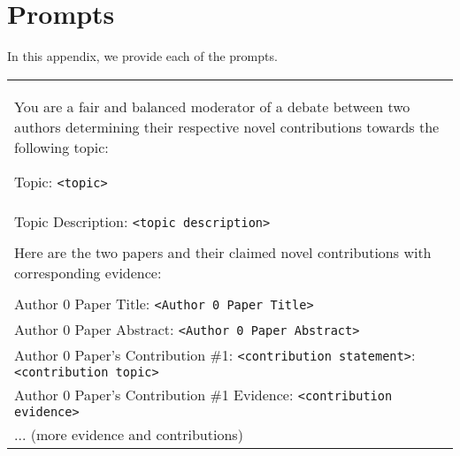 \section{Prompts}
\label{appendix: prompts}
In this appendix, we provide each of the prompts.

\begin{table*}[h]
\centering
\begin{tabularx}{\textwidth}{|X|}
\hline
You are a fair and balanced moderator of a debate between two authors determining their respective novel contributions towards the following topic:

Topic: \texttt{<topic>} \\
Topic Description: \texttt{<topic description>}
\\\\
Here are the two papers and their claimed novel contributions with corresponding evidence:
\\\\
Author 0 Paper Title: \texttt{<Author 0 Paper Title>}\\
Author 0 Paper Abstract: \texttt{<Author 0 Paper Abstract>}\\
Author 0 Paper's Contribution \#1: \texttt{<contribution statement>}: \texttt{<contribution topic>}\\
Author 0 Paper's Contribution \#1 Evidence: \texttt{<contribution evidence>}\\
... (more evidence and contributions)


\end{tabularx}
\end{table*}
